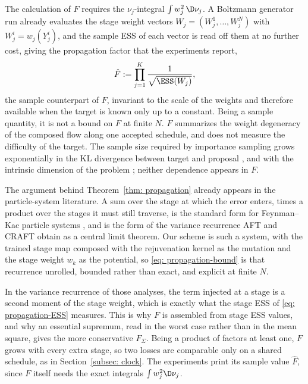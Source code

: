 \documentclass{article}
\begin{document}
The calculation of $F$ requires the $\nu_j$-integral $\int w_j^2 \, \D\nu_j$. A Boltzmann generator run already evaluates the stage weight vectors $W_j = (W_j^1,\dots,W_j^N)$ with $W_j^i = w_j(Y_j^i)$, and the sample ESS of each vector is read off them at no further cost, giving the propagation factor that the experiments report,
\begin{equation}
    \hat F := \prod_{j=1}^{K} \frac{1}{\sqrt{\ESS(W_j)}} ,
    \label{eq: propagation-factor-hat}
\end{equation}
the sample counterpart of $F$, invariant to the scale of the weights and therefore available when the target is known only up to a constant. Being a sample quantity, it is not a bound on $F$ at finite $N$.
$F$ summarizes the weight degeneracy of the composed flow along one accepted schedule, and does not measure the difficulty of the target. The sample size required by importance sampling grows exponentially in the KL divergence between target and proposal \citep{chatterjee2018sample}, and with the intrinsic dimension of the problem \citep{agapiou2017importance}; neither dependence appears in $F$.

The argument behind Theorem~\ref{thm: propagation} already appears in the particle-system literature. A sum over the stage at which the error enters, times a product over the stages it must still traverse, is the standard form for Feynman--Kac particle systems \citep{delmoral2004feynman,chopin2020introduction}, and is the form of the variance recurrence AFT \citep{arbel2021annealed} and CRAFT \citep{matthews2022craft} obtain as a central limit theorem. Our scheme is such a system, with the trained stage map composed with the rejuvenation kernel as the mutation and the stage weight $w_k$ as the potential, so \eqref{eq: propagation-bound} is that recurrence unrolled, bounded rather than exact, and explicit at finite $N$.

In the variance recurrence of those analyses, the term injected at a stage is a second moment of the stage weight, which is exactly what the stage ESS of \eqref{eq: propagation-ESS} measures. This is why $F$ is assembled from stage ESS values, and why an essential supremum, read in the worst case rather than in the mean square, gives the more conservative $F_\Sigma$. Being a product of factors at least one, $F$ grows with every extra stage, so two losses are comparable only on a shared schedule, as in Section~\ref{subsec: clock}. The experiments print its sample value $\hat F$, since $F$ itself needs the exact integrals $\int w_j^2\D\nu_j$.
\end{document}
